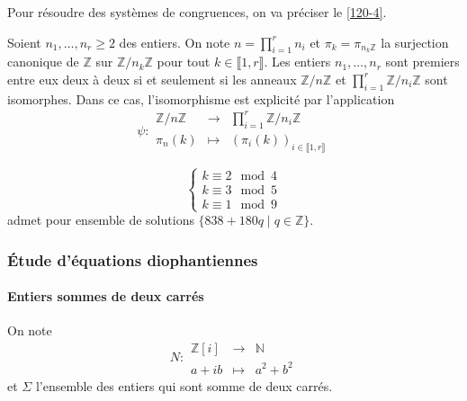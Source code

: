 
  Pour résoudre des systèmes de congruences, on va préciser le \cref{120-4}.

  \begin{theorem}
    Soient $n_1, \dots, n_r \geq 2$ des entiers. On note $n = \prod_{i=1}^r n_i$ et $\pi_k = \pi_{{n_k}\mathbb{Z}}$ la surjection canonique de $\mathbb{Z}$ sur $\mathbb{Z}/n_k\mathbb{Z}$ pour tout $k \in \llbracket 1, r \rrbracket$.
    \newpar
    Les entiers $n_1, \dots, n_r$ sont premiers entre eux deux à deux si et seulement si les anneaux $\mathbb{Z}/n\mathbb{Z}$ et $\prod_{i=1}^{r}\mathbb{Z}/n_i\mathbb{Z}$ sont isomorphes. Dans ce cas, l'isomorphisme est explicité par l'application
    \[
      \psi :
      \begin{array}{ccc}
        \mathbb{Z}/n\mathbb{Z} &\rightarrow& \prod_{i=1}^{r}\mathbb{Z}/n_i\mathbb{Z} \\
        \pi_{n}(k) &\mapsto& (\pi_i(k))_{i \in \llbracket 1, r \rrbracket}
      \end{array}
    \]
  \end{theorem}


  \begin{example}
    \[
      \begin{cases}
        k \equiv 2 \mod 4 \\
        k \equiv 3 \mod 5 \\
        k \equiv 1 \mod 9
      \end{cases}
    \]
    admet pour ensemble de solutions $\{ 838+180q \mid q \in \mathbb{Z} \}$.
  \end{example}

  \subsubsection{Étude d'équations diophantiennes}

  \paragraph{Entiers sommes de deux carrés}


  \begin{notation}
    On note \[ N :
    \begin{array}{ccc}
      \mathbb{Z}[i] &\rightarrow& \mathbb{N} \\
      a+ib &\mapsto& a^2 + b^2
    \end{array}
    \] et $\Sigma$ l'ensemble des entiers qui sont somme de deux carrés.
  \end{notation}

